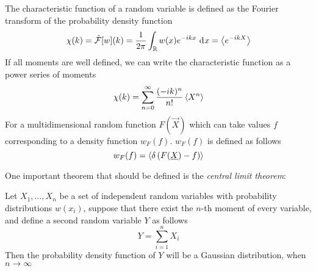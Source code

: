 \documentclass[../qm.tex]{subfiles}
\begin{document}
	\begin{defn}
		The characteristic function of a random variable is defined as the Fourier transform of the probability density function
		\begin{equation*}
			\chi(k)=\hat{\mathcal{F}}[w](k)=\frac{1}{2\pi}\int_{\mathbb{R}}w(x)e^{-ikx}\ \mathrm{d}^{}x=\expval{e^{-ikX}}
		\end{equation*}
		If all moments are well defined, we can write the characteristic function as a power series of moments
		\begin{equation*}
			\chi(k)=\sum_{n=0}^{\infty}\frac{(-ik)^n}{n!}\expval{X^n}
		\end{equation*}
		For a multidimensional random function $F(\vec{X})$ which can take values $f$ corresponding to a density function $w_F(f)$. $w_F(f)$ is defined as follows
		\begin{equation*}
			w_F(f)=\expval{\delta\left( F(\underline{X})-f \right)}
		\end{equation*}
	\end{defn}
	One important theorem that should be defined is the \textit{central limit theorem}:
	\begin{thm}
		Let $X_1,\dots,X_n$ be a set of independent random variables with probability distributions $w(x_i)$, suppose that there exist the $n$-th moment of every variable, and define a second random variable $Y$ as follows
		\begin{equation*}
			Y=\sum_{i=1}^nX_i
		\end{equation*}
		Then the probability density function of $Y$ will be a Gaussian distribution, when $n\to\infty$
	\end{thm}
\end{document}
